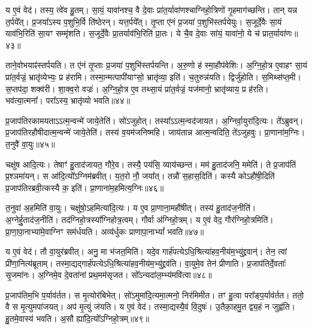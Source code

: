 य ए॒वं वेद॑।
तस्य॒ त्वे॑व हु॒तम्।
सा॒यं॒ यावा॑नश्च॒ वै दे॒वाः प्रा॑त॒र्यावा॑णश्चाग्निहो॒त्रिणो॑ गृ॒हमाग॑च्छन्ति।
तान् यन्न त॒र्पये᳚त्।
प्र॒जया᳚ऽस्य प॒शुभि॒र्वि ति॑ष्ठेरन्।
यत्त॒र्पये᳚त्।
तृ॒प्ता ए॑नं प्र॒जया॑ प॒शुभि॑स्तर्पयेयुः।
स॒जूर्दे॒वैः सा॒यं याव॑भि॒रिति॑ सा॒यꣳ सम्मृ॑शति।
स॒जूर्दे॒वैः प्रा॒तर्याव॑भि॒रिति॑ प्रा॒तः।
ये चै॒व दे॒वाः सा॑यं॒ यावा॑नो॒ ये च॑ प्रात॒र्यावा॑णः॥४३॥\ip

ताने॒वोभयाꣴ॑स्तर्पयति।
त ए॑नं तृ॒प्ताः प्र॒जया॑ प॒शुभि॑स्तर्प\-यन्ति।
अ॒रु॒णो ह॑ स्मा॒हौप॑वेशिः।
अ॒ग्नि॒हो॒त्र ए॒वाहꣳ सा॒यं प्रा॑त॒र्वज्रं॒ भ्रातृ॑व्येभ्यः॒ प्र ह॑रामि।
तस्मा॒न्मत्पापी॑याꣳसो॒ भ्रातृ॑व्या॒ इति॑।
च॒तुरुन्न॑यति।
द्विर्जु॑होति।
स॒मिथ्स॑प्त॒मी।
स॒प्तप॑दा॒ शक्व॑री।
शा॒क्व॒रो वज्रः॑।
अ॒ग्नि॒हो॒त्र ए॒व तथ्सा॒यं प्रा॑त॒र्वज्रं॒ यज॑मानो॒ भ्रातृ॑व्याय॒ प्र ह॑रति।
भव॑त्या॒त्मना᳚।
परा᳚ऽस्य॒ भ्रातृ॑व्यो भवति॥४४॥\ip{}

प्र॒जा\-प॑तिरकामयता\-ऽऽत्म॒न्वन्मे॑ जाये॒तेति॑।
सो॑ऽजुहोत्।
तस्या᳚\-ऽऽत्म॒न्वद॑जायत।
अ॒ग्निर्वा॒युरा॑दि॒त्यः।
ते᳚ऽब्रुवन्।
प्र॒जा\-प॑तिर\-हौषी\-दात्म॒न्वन्मे॑ जाये॒तेति॑।
तस्य॑ व॒यम॑जनिष्महि।
जाय॑तान्न आत्म॒न्वदिति॒ ते॑\-ऽजुहवुः।
प्रा॒णाना॑म॒ग्निः।
त॒नुवै॑ वा॒युः॥४५॥\ip

चक्षु॑ष आदि॒त्यः।
तेषाꣳ॑ हु॒ताद॑जायत॒ गौरे॒व।
तस्यै॒ पय॑सि॒ व्याय॑च्छन्त।
मम॑ हु॒ताद॑जनि॒ ममेति॑।
ते प्र॒जा\-प॑तिं प्र॒श्ञमा॑यन्।
स आ॑दि॒त्यो᳚\-ऽग्निम॑ब्रवीत्।
य॒त॒रो नौ॒ जया᳚त्।
तन्नौ॑ स॒हास॒दिति॑।
कस्यै कोऽहौ॑षी॒दिति॑ प्र॒जा\-प॑तिरब्रवी॒त्कस्यै क॒ इति॑।
प्रा॒णाना॑म॒हमित्य॒ग्निः॥४६॥\ip

त॒नुवा॑ अ॒हमिति॑ वा॒युः।
चक्षु॑षो॒\-ऽहमित्या॑दि॒त्यः।
य ए॒व प्रा॒णाना॒महौ॑षीत्।
तस्य॑ हु॒ताद॑ज॒नीति॑।
अ॒ग्नेर्\mbox{}हु॒ताद॑ज॒नीति॑।
तद॑ग्निहो॒त्रस्या᳚ग्निहोत्र॒त्वम्।
गौर्वा अ॑ग्निहो॒त्रम्।
य ए॒वं वेद॒ गौर॑ग्निहो॒त्रमिति॑।
प्रा॒णा॒पा॒नाभ्या॑मे॒वाग्निꣳ सम॑र्धयति।
अव्य॑र्धुकः प्राणापा॒नाभ्यां᳚ भवति॥४७॥\ip

य ए॒वं वेद॑।
तौ वा॒युर॑ब्रवीत्।
अनु॒ मा भ॑जत॒मिति॑।
यदे॒व गार्\mbox{}ह॑पत्ये\-ऽधि॒श्रित्या॑हव॒नीय॑म॒भ्यु॑द्द्रवान्॑।
तेन॒ त्वां प्री॑णा॒नित्य॑ब्रूताम्।
तस्मा॒द्यद्गार्\mbox{}ह॑पत्ये\-ऽधि॒श्रित्या॑हव॒नीय॑\-म॒भ्यु॑द्द्रव॑ति।
वा॒युमे॒व तेन॑ प्रीणाति।
प्र॒जा\-प॑तिर्दे॒वताः᳚ सृ॒जमा॑नः।
अ॒ग्निमे॒व दे॒वता॑नां प्रथ॒मम॑\-सृजत।
सो᳚ऽन्यदा॑\-ल॒म्भ्य॑मवि॑त्वा॥४८॥\ip

प्र॒जा\-प॑तिम॒भि प॒र्याव॑र्तत।
स मृ॒त्योर॑बिभेत्।
सो॑ऽमुमा॑दि॒त्य\-मा॒त्मनो॒ निर॑मिमीत।
तꣳ हु॒त्वा परा᳚ङ्प॒र्याव॑र्तत।
ततो॒ वै स मृ॒त्युमपा॑जयत्।
अप॑ मृ॒त्युं ज॑यति।
य ए॒वं वेद॑।
तस्मा॒द्यस्यै॒वं वि॒दुषः॑।
उ॒तैका॒हमु॒त द्व्य॒हं न जुह्व॑ति।
हु॒तमे॒वास्य॑ भवति।
अ॒सौ ह्या॑दि॒त्यो᳚\-ऽग्निहो॒त्रम्॥४९॥\ip\anuvakamend[त॒नुवै॑ वा॒युर॒ग्निर्भ॑व॒त्यवि॑त्वा भव॒त्येकं॑ च]

